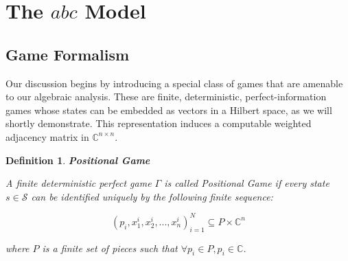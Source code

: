 \documentclass[11pt,a4paper]{article}
\theoremstyle{plain}
\newtheorem{definition}{Definition}[section]
\theoremstyle{definition}
\begin{document}
\vspace{0.5em}

\section{The \(abc\) Model}
\label{sec:abc-model}

\vspace{0.5em}

\subsection{Game Formalism}
\label{subsec:game-formalism}

\vspace{0.5em}

Our discussion begins by introducing a special class of games that are amenable to our algebraic analysis. These are finite, deterministic, perfect-information games whose states can be embedded as vectors in a Hilbert space, as we will shortly demonstrate. This representation induces a computable weighted adjacency matrix in $\mathbb{C}^{n \times n}$.

\vspace{0.5em}

\begin{definition}\textbf{Positional Game}

\vspace{0.5em}

A finite deterministic perfect game $\Gamma$ is called \emph{Positional Game} if every state $s\in \mathcal{S}$ can be identified uniquely by the following finite sequence:

\vspace{0.5em}

\begin{equation}
(p_i,x^i_1,x^i_2,...,x^i_n)_{i=1}^N \subseteq P\times\mathbb{C}^{n}
\label{def:Positional-Game}
\end{equation}

\vspace{0.5em}

where $P$ is a finite set of pieces such that $\forall p_i \in P, p_i \in \mathbb{C}$.

\vspace{0.5em}

\label{def:positional-game}
\end{definition}

\vspace{0.5em}
\end{document}
